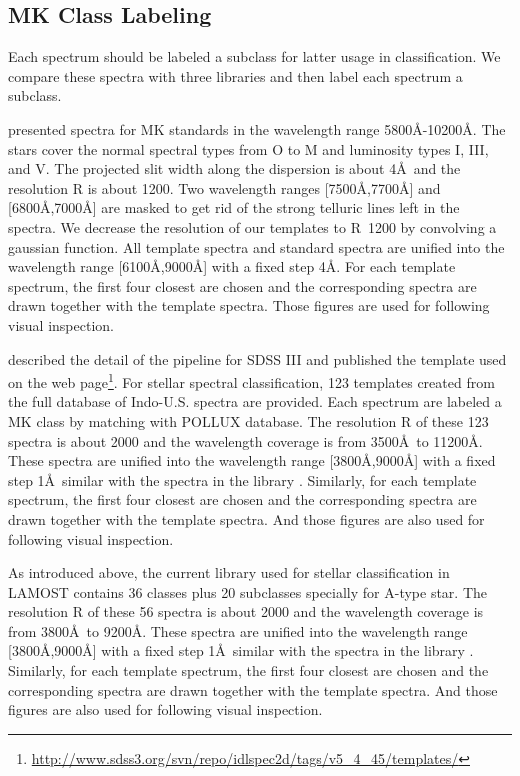 \documentclass[referee]{raa}            %
\begin{document}
\subsection{MK Class Labeling}
Each spectrum should be labeled a subclass for latter usage in classification.
We compare these spectra with three libraries and then label each spectrum a subclass.

\citet{danks1994atlas} presented spectra  for MK standards in the wavelength range    5800\AA-10200\AA.
The stars cover the normal spectral types from O to M and    luminosity types I, III, and V.
The projected slit width along the dispersion is about 4\AA\ and the resolution R is about 1200.
Two wavelength ranges [7500\AA,7700\AA] and [6800\AA,7000\AA] are masked to get rid of the strong telluric lines left in the spectra.
We decrease the resolution of our templates to R~1200 by convolving a gaussian function.
All template spectra and standard spectra are unified into the wavelength range [6100\AA,9000\AA] with a fixed step 4\AA.
For each template spectrum, the first four  closest  are chosen and the corresponding spectra are drawn together with the template spectra.
Those figures are used for following visual inspection.

\citet{bolton2012spectral} described the detail of the pipeline for SDSS III and published the template used on the web page\footnote{\url{http://www.sdss3.org/svn/repo/idlspec2d/tags/v5_4_45/templates/}}.
For stellar spectral classification,  123 templates created from the full database of Indo-U.S. spectra are provided.
Each spectrum are labeled a MK class by matching with POLLUX database.
The resolution R of these 123 spectra is about 2000 and the wavelength coverage is from 3500\AA\ to 11200\AA.
These spectra are unified into the wavelength range [3800\AA,9000\AA] with a fixed step 1\AA\ similar with the spectra in the library .
Similarly, for each template spectrum, the first four  closest are chosen and the corresponding spectra are drawn together with the template spectra.
And those figures are also used for following visual inspection.

As introduced above, the current library used for stellar classification in LAMOST contains 36 classes plus 20 subclasses specially for A-type star.
The resolution R of these 56 spectra is about 2000 and the wavelength coverage is from 3800\AA\ to 9200\AA.
These spectra are unified into the wavelength range [3800\AA,9000\AA] with a fixed step 1\AA\ similar with the spectra in the library .
Similarly, for each template spectrum, the first four  closest are chosen and the corresponding spectra are drawn together with the template spectra.
And those figures are also used for following visual inspection.
\end{document}
